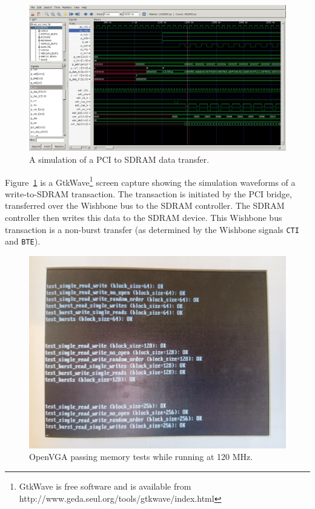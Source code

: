 \begin{figure}[h!]
\includegraphics[width=\linewidth]{images/pci_to_sdram_xfer.png}
\caption[A simulation of a PCI to SDRAM data transfer]{A simulation of a PCI to
SDRAM data transfer.}
\label{MEM_GtkWave_SDRAM}
\end{figure}

Figure~\ref{MEM_GtkWave_SDRAM} is a GtkWave\footnote{GtkWave is free software and
is available from http://www.geda.seul.org/tools/gtkwave/index.html} screen
capture showing the simulation waveforms of a write-to-SDRAM transaction. The
transaction is initiated by the PCI bridge, transferred over the Wishbone bus to
the SDRAM controller. The SDRAM controller then writes this data to the SDRAM
device. This Wishbone bus transaction is a non-burst transfer (as determined by
the Wishbone signals \texttt{CTI} and \texttt{BTE}).

\begin{figure}[h!]
\begin{center}
\includegraphics[width=\linewidth]{images/mem_test.jpeg}
\caption[SDRAM Memory Test Results]{OpenVGA passing memory tests
while running at 120 MHz.}
\label{MEM_Testing}
\end{center}
\end{figure}

